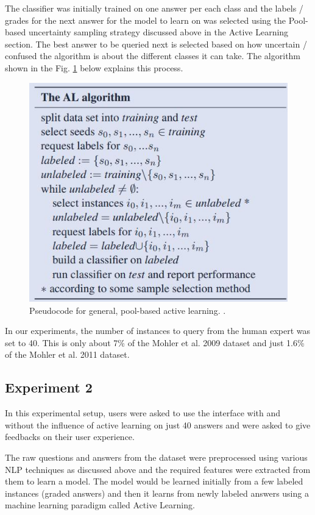 The classifier was initially trained on one answer per each class and the labels / grades for the next answer for the model to learn on was selected using the Pool-based uncertainty sampling strategy discussed above in the Active Learning section. The best answer to be queried next is selected based on how uncertain / confused the algorithm is about the different classes it can take.  The algorithm shown in the Fig. \ref{uncertainty-al} below explains this process. 

\begin{figure}[h]
	\centering
	\includegraphics[scale=0.6]{images/uncertainty-al-pseudocode}
	\caption{Pseudocode for general, pool-based active learning. \cite{Horbach2016}.}
	\label{uncertainty-al}
\end{figure}

In our experiments, the number of instances to query from the human expert was set to 40. This is only about 7\% of the Mohler et al. 2009 dataset and just 1.6\% of the Mohler et al. 2011 dataset. 


\subsection{Experiment 2}

In this experimental setup, users were asked to use the interface with and without the influence of active learning on just 40 answers and were asked to give feedbacks on their user experience.  

The raw questions and answers from the dataset were preprocessed using various NLP techniques as discussed above and the required features were extracted from them to learn a model. The model would be learned initially from a few labeled instances (graded answers) and then it learns from newly labeled answers using a machine learning paradigm called Active Learning.

